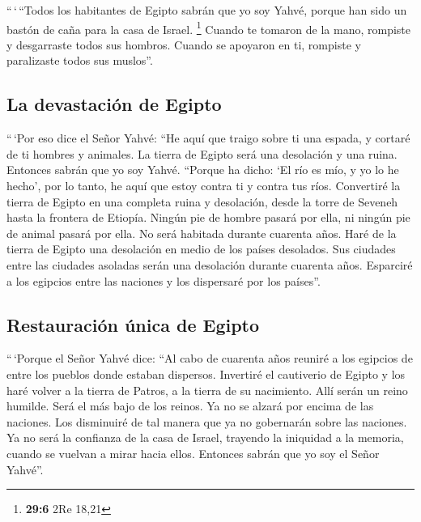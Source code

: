\begin{paracol}{2}
 ``\,`\,``Todos los habitantes de Egipto sabrán que yo soy
Yahvé, porque han sido un bastón de caña para la casa de Israel.
\footnote{\textbf{29:6} 2Re 18,21}  Cuando te tomaron de
la mano, rompiste y desgarraste todos sus hombros. Cuando se apoyaron en
ti, rompiste y paralizaste todos sus muslos''.

\hypertarget{la-devastaciuxf3n-de-egipto}{%
\subsection{La devastación de
Egipto}\label{la-devastaciuxf3n-de-egipto}}

 ``\,`Por eso dice el Señor Yahvé: ``He aquí que traigo
sobre ti una espada, y cortaré de ti hombres y animales. 
La tierra de Egipto será una desolación y una ruina. Entonces sabrán que
yo soy Yahvé. ``Porque ha dicho: `El río es mío, y yo lo he hecho',
 por lo tanto, he aquí que estoy contra ti y contra tus
ríos. Convertiré la tierra de Egipto en una completa ruina y desolación,
desde la torre de Seveneh hasta la frontera de Etiopía. 
Ningún pie de hombre pasará por ella, ni ningún pie de animal pasará por
ella. No será habitada durante cuarenta años.  Haré de la
tierra de Egipto una desolación en medio de los países desolados. Sus
ciudades entre las ciudades asoladas serán una desolación durante
cuarenta años. Esparciré a los egipcios entre las naciones y los
dispersaré por los países''.

\hypertarget{restauraciuxf3n-uxfanica-de-egipto}{%
\subsection{Restauración única de
Egipto}\label{restauraciuxf3n-uxfanica-de-egipto}}

 ``\,`Porque el Señor Yahvé dice: ``Al cabo de cuarenta
años reuniré a los egipcios de entre los pueblos donde estaban
dispersos.  Invertiré el cautiverio de Egipto y los haré
volver a la tierra de Patros, a la tierra de su nacimiento. Allí serán
un reino humilde.  Será el más bajo de los reinos. Ya no
se alzará por encima de las naciones. Los disminuiré de tal manera que
ya no gobernarán sobre las naciones.  Ya no será la
confianza de la casa de Israel, trayendo la iniquidad a la memoria,
cuando se vuelvan a mirar hacia ellos. Entonces sabrán que yo soy el
Señor Yahvé''.


\end{paracol}
